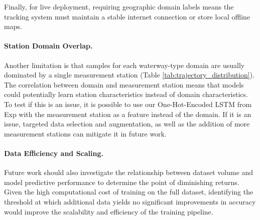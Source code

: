 Finally, for live deployment, requiring geographic domain labels means the tracking system must maintain a stable internet connection or store local offline maps.



\paragraph{Station Domain Overlap.} 
Another limitation is that samples for each waterway-type domain are usually dominated by a single measurement station (Table \ref{tab:trajectory_distribution}). The correlation between domain and measurement station means that models could potentially learn station characteristics instead of domain characteristics. To test if this is an issue, it is possible to use our One-Hot-Encoded \ac{LSTM} from Exp  with the measurement station as a feature instead of the domain. If it is an issue, targeted data selection and augmentation, as well as the addition of more measurement stations can mitigate it in future work.


\paragraph{Data Efficiency and Scaling.} Future work should also investigate the relationship between dataset volume and model predictive performance to determine the point of diminishing returns. Given the high computational cost of training on the full dataset, identifying the threshold at which additional data yields no significant improvements in accuracy would improve the scalability and efficiency of the training pipeline.


